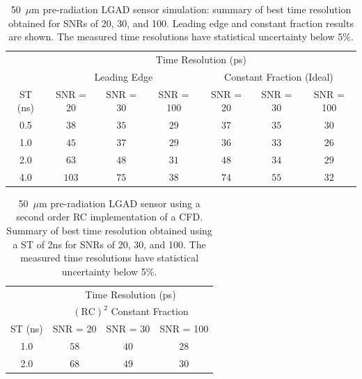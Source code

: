 \documentclass[preprint,1p]{elsarticle}
\begin{document}
\begin{table}
    \begin{tabular}{c|ccc|ccc}
    \multicolumn{1}{c}{}& \multicolumn{6}{c}{Time Resolution (ps)} \\
    \multicolumn{1}{c}{}&\multicolumn{3}{c}{Leading Edge} & \multicolumn{3}{c}{Constant Fraction (Ideal)}\\ \hline
    ST (ns) & SNR = 20   & SNR = 30      & SNR = 100     & SNR = 20      & SNR = 30      & SNR = 100 \\
    0.5 & $38$    & $35$  & $29$  & $37$  & $35$  & $30$ \\
    1.0 & $45$    & $37$  & $29$  & $36$  & $33$  & $26$ \\
    2.0 & $63$    & $48$  & $31$  & $48$  & $34$  & $29$ \\
    4.0 & $103$  & $75$  & $38$  & $74$  & $55$  & $32$ \\
    \end{tabular}
    \caption{50~$\mu$m pre-radiation LGAD sensor simulation: summary of best time resolution obtained for SNRs
    of 20, 30, and 100. Leading edge and constant fraction results are shown. The measured time resolutions
    have statistical uncertainty below 5\%. }
    \label{tab:prerad}
 \end{table}


 \begin{table}
   \begin{center}
     \begin{tabular}{c|ccc}
     \multicolumn{1}{c}{}& \multicolumn{3}{c}{Time Resolution (ps)} \\
     \multicolumn{1}{c}{}& \multicolumn{3}{c}{$\mathrm{(RC)}^{2}$ Constant Fraction}\\ \hline
     ST (ns) & SNR = 20      & SNR = 30      & SNR = 100 \\
     1.0 & $58$  & $ 40$  & $28$ \\
     2.0 & $68$  & $ 49$  & $30$ \\     
     \end{tabular}
     \caption{50~$\mu$m pre-radiation LGAD sensor using a second order RC implementation of a CFD.
     Summary of best time resolution obtained using a ST of 2\si{ns} for SNRs of 20, 30, and 100. The measured time resolutions
    have statistical uncertainty below 5\%.}
     \label{tab:prerad_psCFD}
   \end{center}
  \end{table}
\end{document}

